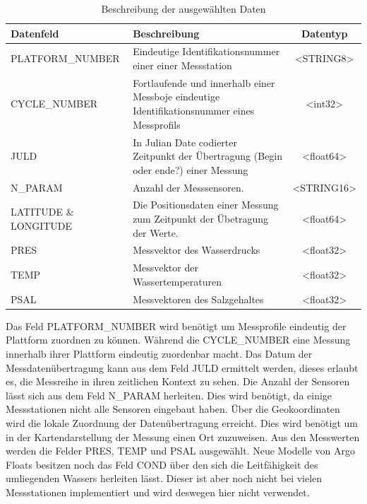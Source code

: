 \begin{center}
\begin{table}
  \label{table:Datenauswahl}
  \begin{tabular}{ | l | p{7cm}| c |}
    \hline
    \textbf{Datenfeld} & \textbf{Beschreibung} & \textbf{Datentyp} \\\hline
   
    PLATFORM\_NUMBER 
        &  Eindeutige Identifikationsnummer einer einer Messstation
        & <STRING8>
        \\\hline 
    
    CYCLE\_NUMBER 
        &  Fortlaufende und innerhalb einer Messboje eindeutige Identifikationsnummer eines Messprofils
        & <int32>
        \\\hline
    
    JULD
        & In Julian Date codierter Zeitpunkt der Übertragung (Begin oder ende?) einer Messung
        & <float64>
       \\\hline
        
    N\_PARAM
        & Anzahl der Messsensoren. 
        & <STRING16>
        \\\hline
        
    LATITUDE \& LONGITUDE
        & Die Positionsdaten einer Messung zum Zeitpunkt der Übetragung der Werte.
        & <float64>
        \\\hline
        
    PRES
        & Messvektor des Wasserdrucks
        & <float32>
        \\\hline
        
    TEMP
        & Messvektor der Wassertemperaturen 
        & <float32>
          \\\hline
        
    PSAL
        & Messvektoren des Salzgehaltes
        & <float32>
         \\\hline
    \end{tabular}
      \caption{Beschreibung der ausgewählten Daten}
\end{table}
\end{center}

Das Feld PLATFORM\_NUMBER wird benötigt um Messprofile eindeutig der Plattform zuordnen zu können. Während die CYCLE\_NUMBER eine Messung innerhalb ihrer Plattform eindeutig zuordenbar macht. Das Datum der Messdatenübertragung kann aus dem Feld JULD ermittelt werden, dieses erlaubt es, die Messreihe in ihren zeitlichen Kontext zu sehen. Die Anzahl der Sensoren lässt sich aus dem Feld N\_PARAM herleiten. Dies wird benötigt, da einige Messstationen nicht alle Sensoren eingebaut haben. Über die Geokoordinaten wird die lokale Zuordnung der Datenübertragung erreicht. Dies wird benötigt um in der Kartendarstellung der Messung einen Ort zuzuweisen.
Aus den Messwerten werden die Felder PRES, TEMP und PSAL ausgewählt. Neue Modelle von Argo Floats besitzen noch das Feld COND über den sich die Leitfähigkeit des umliegenden Wassers herleiten lässt. Dieser ist aber noch nicht bei vielen Messstationen implementiert und wird deswegen hier nicht verwendet.


